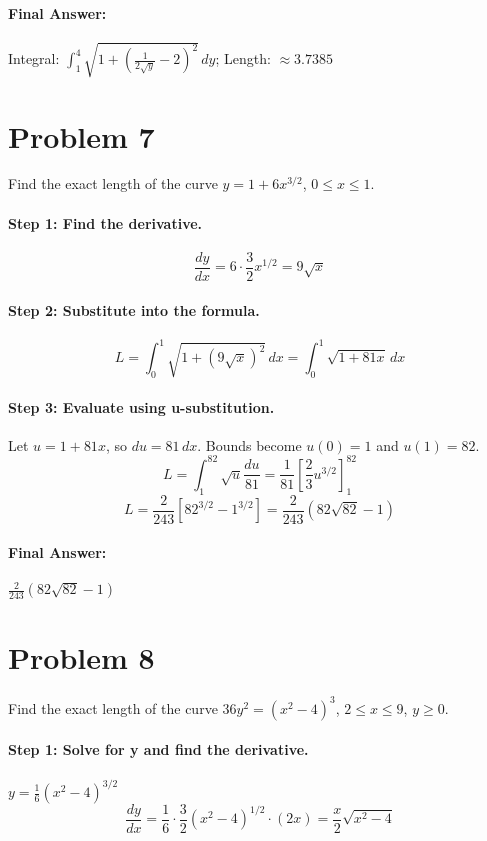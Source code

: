 \documentclass{article}
\begin{document}
\paragraph{Final Answer:} Integral: $\int_{1}^{4} \sqrt{1 + (\frac{1}{2\sqrt{y}} - 2)^2} \,dy$; Length: $\approx 3.7385$

\section*{Problem 7}
Find the exact length of the curve $y = 1 + 6x^{3/2}$, $0 \le x \le 1$.

\paragraph{Step 1: Find the derivative.}
\[ \frac{dy}{dx} = 6 \cdot \frac{3}{2}x^{1/2} = 9\sqrt{x} \]

\paragraph{Step 2: Substitute into the formula.}
\[ L = \int_{0}^{1} \sqrt{1 + (9\sqrt{x})^2} \,dx = \int_{0}^{1} \sqrt{1 + 81x} \,dx \]

\paragraph{Step 3: Evaluate using u-substitution.}
Let $u = 1 + 81x$, so $du = 81 \,dx$. Bounds become $u(0)=1$ and $u(1)=82$.
\[ L = \int_{1}^{82} \sqrt{u} \frac{du}{81} = \frac{1}{81} [\frac{2}{3}u^{3/2}]_{1}^{82} \]
\[ L = \frac{2}{243} [82^{3/2} - 1^{3/2}] = \frac{2}{243} (82\sqrt{82} - 1) \]

\paragraph{Final Answer:} $\frac{2}{243} (82\sqrt{82} - 1)$

\section*{Problem 8}
Find the exact length of the curve $36y^2 = (x^2 - 4)^3$, $2 \le x \le 9$, $y \ge 0$.

\paragraph{Step 1: Solve for y and find the derivative.}
$y = \frac{1}{6}(x^2 - 4)^{3/2}$
\[ \frac{dy}{dx} = \frac{1}{6} \cdot \frac{3}{2}(x^2 - 4)^{1/2} \cdot (2x) = \frac{x}{2}\sqrt{x^2 - 4} \]
\end{document}
